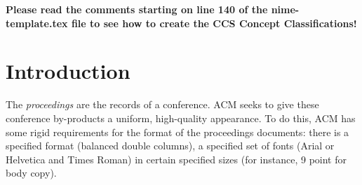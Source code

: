 \documentclass{style/nime-alternate}
\begin{document}
%
% 
%


\printccsdesc

\textbf{Please read the comments starting on line 140 of the nime-template.tex file to see how to create the CCS Concept Classifications!} %

\section{Introduction}
The \textit{proceedings} are the records of a conference.
ACM seeks to give these conference by-products a uniform,
high-quality appearance.  To do this, ACM has some rigid
requirements for the format of the proceedings documents: there
is a specified format (balanced  double columns), a specified
set of fonts (Arial or Helvetica and Times Roman) in
certain specified sizes (for instance, 9 point for body copy).
\end{document}
